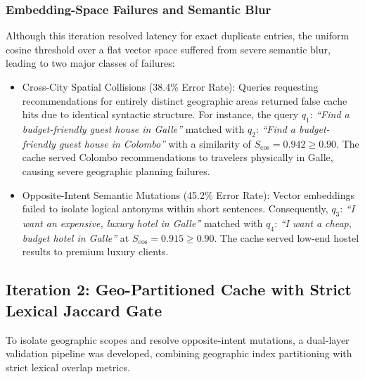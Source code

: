 \documentclass{ieeeaccess}
\begin{document}
\subsubsection{Embedding-Space Failures and Semantic Blur}
Although this iteration resolved latency for exact duplicate entries, the uniform cosine threshold over a flat vector space suffered from severe semantic blur, leading to two major classes of failures:
\begin{itemize}
    \item{Cross-City Spatial Collisions (38.4\% Error Rate)}: Queries requesting recommendations for entirely distinct geographic areas returned false cache hits due to identical syntactic structure. For instance, the query $q_1$: \emph{``Find a budget-friendly guest house in Galle''} matched with $q_2$: \emph{``Find a budget-friendly guest house in Colombo''} with a similarity of $S_{\text{cos}} = 0.942 \ge 0.90$. The cache served Colombo recommendations to travelers physically in Galle, causing severe geographic planning failures.
    \item{Opposite-Intent Semantic Mutations (45.2\% Error Rate)}: Vector embeddings failed to isolate logical antonyms within short sentences. Consequently, $q_3$: \emph{``I want an expensive, luxury hotel in Galle''} matched with $q_4$: \emph{``I want a cheap, budget hotel in Galle''} at $S_{\text{cos}} = 0.915 \ge 0.90$. The cache served low-end hostel results to premium luxury clients.
\end{itemize}

\subsection{Iteration 2: Geo-Partitioned Cache with Strict Lexical Jaccard Gate}
To isolate geographic scopes and resolve opposite-intent mutations, a dual-layer validation pipeline was developed, combining geographic index partitioning with strict lexical overlap metrics.
\end{document}

